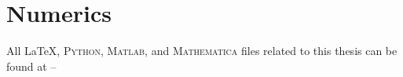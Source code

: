 
%

\providecommand\Matlab{\textsc{Matlab}}
\providecommand\Mathematica{\textsc{Mathematica}}
\providecommand\Labview{\textsc{LabVIEW}}
\providecommand\Zemax{\textsc{Zemax}}
\providecommand\Science{\textsc{Science}}
\providecommand\Nature{\textsc{Nature}}
\providecommand\GitHub{\textsc{GitHub}}
\providecommand\LinkedIn{\textsc{LinkedIn}}
\providecommand\Python{\textsc{Python}}



\chapter{Numerics}
\label{append:Numerics}

All \LaTeX, \Python{}, \Matlab{}, and \Mathematica{} files related to this thesis can be found at -- 


